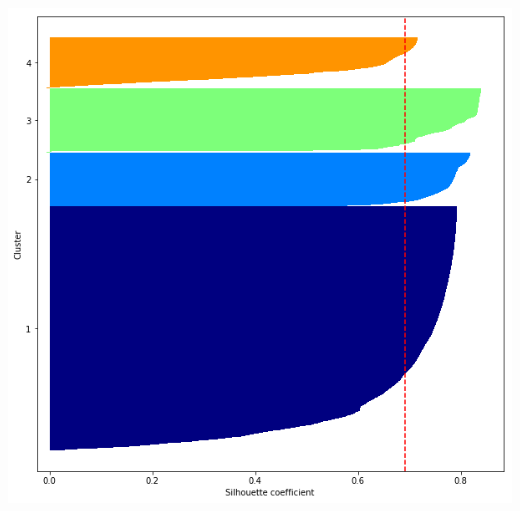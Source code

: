 \documentclass[12pt,a4paper]{article}
\begin{document}
\begin{center}
	\includegraphics[scale=0.25]{figures/Silhouette.png}
	\label{fig:Silhouette}
\end{center}
\end{document}
